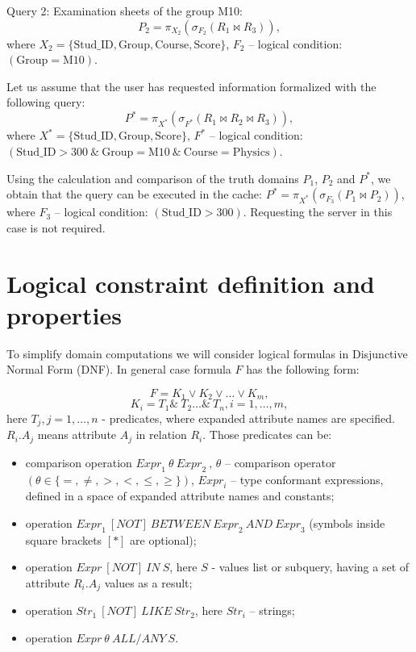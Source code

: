 \documentclass[prodmode,acmtods]{acmsmall} %
\def \n #1{\mathit{#1}}
\begin{document}
Query 2: Examination sheets of the group M10:
$$P_2 = \pi_{X_2}(\sigma_{F_2} (R_1 \Join R_3)),$$
where
$X_2 = \{\text{Stud\_ID}, \text{Group}, \text{Course}, \text{Score}\}$, $F_2$
-- logical condition: $(\text{Group}=\text{M10})$.

Let us assume that the user has requested information formalized with the
following query:
$$P^{\ast} = \pi_{X^{\ast}}(\sigma_{F^{\ast}} (R_1 \Join R_2 \Join R_3 )),$$
where $X^{\ast}= \{\text{Stud\_ID}, \text{Group}, \text{Score}\}$, $F^{\ast}$
-- logical condition: $(\text{Stud\_ID} > 300\ \&\ \text{Group} =
\text{M10}\ \&\ \text{Course} = \text{Physics})$.

Using the calculation and comparison of the truth domains $P_1$, $P_2$ and
$P^{\ast}$, we obtain that the query can be executed in the cache:
$P^{\ast} =\pi_{X^{\ast}}(\sigma_{F_3} (P_1 \Join P_2 ))$, where $F_3$
-- logical condition: $(\text{Stud\_ID} > 300)$. Requesting the server in this
case is not required.


\section{Logical constraint definition and properties}
To simplify domain computations we will consider logical formulas in
Disjunctive Normal Form (DNF). In general case formula $F$ has the following
form:

\begin{equation}
F = K_1 \vee K_2 \vee \dots \vee K_m ,
\label{def_F_1}
\end{equation}
\begin{equation}
K_i = T_1 \&\ T_2 \dots \&\ T_n, i = 1, \dots, m ,
\label{def_F_2}
\end{equation}
here $T_j, j = 1, \dots, n$ - predicates, where expanded attribute names are
specified. $R_i.A_j$ means attribute $A_j$ in relation $R_i$.
Those predicates can be:
\begin{itemize}
\item comparison operation $ \n{Expr}_1\ \theta\ \n{Expr}_2\ $, $\theta$
-- comparison operator $(\theta \in \{=, \neq, >, <, \leq, \geq\})$,
$\n{Expr}_i$ -- type conformant expressions, defined in a space of expanded
attribute names and constants;
\item operation $\n{Expr}_1\ \n{[NOT]}\ \n{BETWEEN}\ \n{Expr}_2\ \n{AND}\
\n{Expr}_3$
(symbols inside square brackets $[*]$ are optional);
\item operation $\n{Expr}\ \n{[NOT]}\ \n{IN}\ S$, here $S$ - values list or
subquery, having a set of attribute $R_i.A_j$ values as a result;
\item operation $\n{Str}_1\ \n{[NOT]}\ \n{LIKE}\ \n{Str}_2$, here $\n{Str}_i$
-- strings;
\item operation $\n{Expr}\ \theta\ \n{ALL/ANY}\ S$.
\end{itemize}
\end{document}
